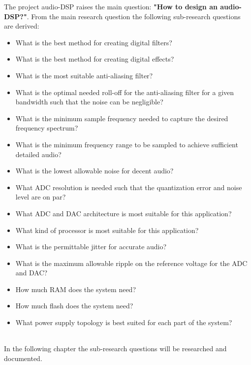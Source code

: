 The project audio-DSP raises the main question: \textbf{"How to design an audio-DSP?"}. From the main research question the following sub-research questions are derived:

\begin{itemize}
\item What is the best method for creating digital filters?
\item What is the best method for creating digital effects?
\item What is the most suitable anti-aliasing filter?
\item What is the optimal needed roll-off for the anti-aliasing filter for a given bandwidth such that the noise can be negligible?
\item What is the minimum sample frequency needed to capture the desired frequency spectrum?
\item What is the minimum frequency range to be sampled to achieve sufficient detailed audio?
\item What is the lowest allowable noise for decent audio?
\item What ADC resolution is needed such that the quantization error and noise level are on par?
\item What ADC and DAC architecture is most suitable for this application?
\item What kind of processor is most suitable for this application?
\item What is the permittable jitter for accurate audio?
\item What is the maximum allowable ripple on the reference voltage for the ADC and DAC?
\item How much RAM does the system need?
\item How much flash does the system need?
\item What power supply topology is best suited for each part of the system?
\end{itemize}

\noindent \\In the following chapter the sub-research questions will be researched and documented.